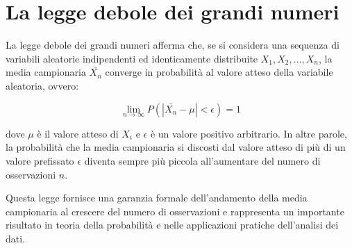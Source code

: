 \chapter{La legge debole dei grandi numeri}
La legge debole dei grandi numeri afferma che, se si considera una sequenza di variabili aleatorie indipendenti ed identicamente distribuite $X_1, X_2, \ldots, X_n$, la media campionaria $\bar{X_n}$ converge in probabilità al valore atteso della variabile aleatoria, ovvero:

$$\lim_{n \to \infty} P(|\bar{X_n} - \mu| < \epsilon) = 1$$

dove $\mu$ è il valore atteso di $X_i$ e $\epsilon$ è un valore positivo arbitrario. In altre parole, la probabilità che la media campionaria si discosti dal valore atteso di più di un valore prefissato $\epsilon$ diventa sempre più piccola all'aumentare del numero di osservazioni $n$.

Questa legge fornisce una garanzia formale dell'andamento della media campionaria al crescere del numero di osservazioni e rappresenta un importante risultato in teoria della probabilità e nelle applicazioni pratiche dell'analisi dei dati.
